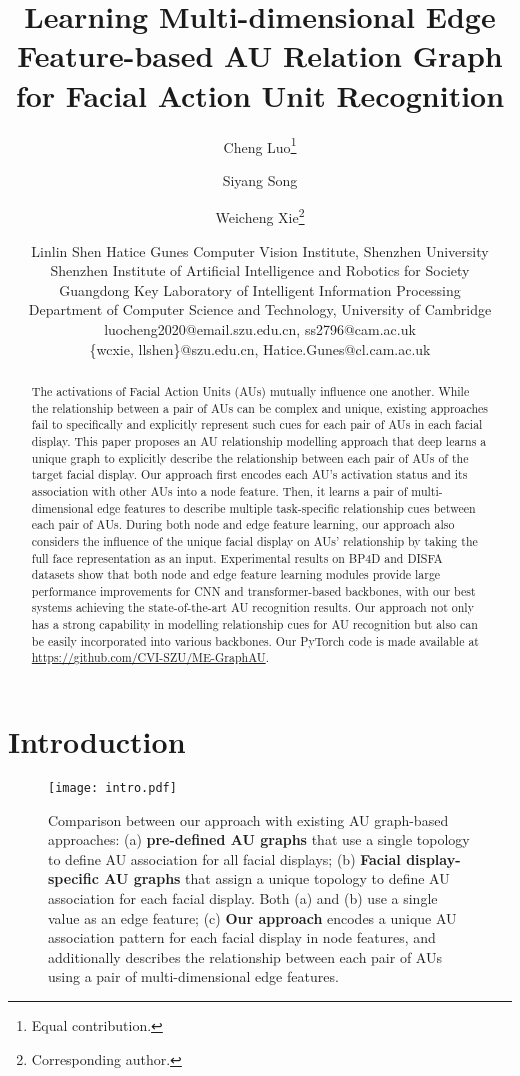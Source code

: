 \documentclass{article}
\title{Learning Multi-dimensional Edge Feature-based AU Relation Graph for Facial Action Unit Recognition}
\author{
Cheng Luo\thanks{Equal contribution.}
\and
Siyang Song\footnotemark[1]\and
Weicheng Xie\thanks{Corresponding author.}\and 
Linlin Shen\And
Hatice Gunes
\affiliations
Computer Vision Institute, Shenzhen University\\
Shenzhen Institute of Artificial Intelligence and Robotics for Society\\
Guangdong Key Laboratory of Intelligent Information Processing  \\
Department of Computer Science and Technology, University of Cambridge
\emails
luocheng2020@email.szu.edu.cn, 
ss2796@cam.ac.uk\\
\{wcxie, llshen\}@szu.edu.cn,
Hatice.Gunes@cl.cam.ac.uk
}
\begin{document}
\maketitle

\begin{abstract}


The activations of Facial Action Units (AUs) mutually influence one another. While the relationship between a pair of AUs can be complex and unique, existing approaches fail to specifically and explicitly represent such cues for each pair of AUs in each facial display. This paper proposes an AU relationship modelling approach that deep learns a unique graph to explicitly describe the relationship between each pair of AUs of the target facial display. Our approach first encodes each AU's activation status and its association with other AUs into a node feature. Then, it learns a pair of multi-dimensional edge features to describe multiple task-specific relationship cues between each pair of AUs. During both node and edge feature learning, our approach also considers the influence of the unique facial display on AUs' relationship by taking the full face representation as an input. Experimental results on BP4D and DISFA datasets show that both node and edge feature learning modules provide large performance improvements for CNN and transformer-based backbones, with our best systems achieving the state-of-the-art AU recognition results. Our approach not only has a strong capability in modelling relationship cues for AU recognition but also can be easily incorporated into various backbones. Our PyTorch code is made available at \url{https://github.com/CVI-SZU/ME-GraphAU}.



\end{abstract}


\section{Introduction}


\begin{figure}[t]
  \centering
  \texttt{[image: intro.pdf]}
  \caption{Comparison between our approach with existing AU graph-based approaches: (a) \textbf{pre-defined AU graphs} that use a single topology to define AU association for all facial displays; (b) \textbf{Facial display-specific AU graphs} that assign a unique topology to define AU association for each facial display. Both (a) and (b) use a single value as an edge feature; (c) \textbf{Our approach} encodes a unique AU association pattern for each facial display in node features, and additionally describes the relationship between each pair of AUs using a pair of multi-dimensional edge features.}
\label{fig:intro}
\end{figure}
\end{document}
